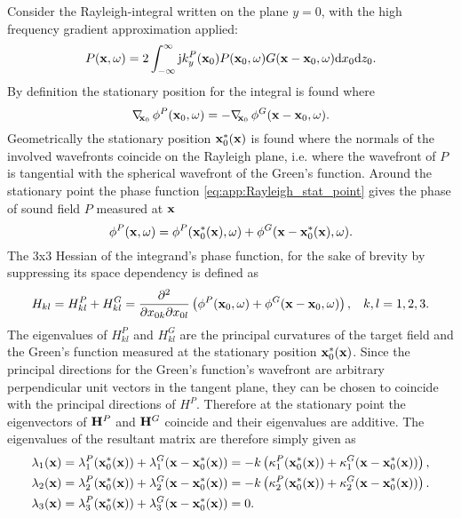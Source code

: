Consider the Rayleigh-integral written on the plane $y = 0$, with the high frequency gradient approximation applied:
\begin{equation}
P(\mathbf{x},\omega) = 2 \int_{-\infty}^{\infty} \mathrm{j} k_y^P(\mathbf{x}_0) P(\mathbf{x}_0, \omega) G(\mathbf{x}-\mathbf{x}_0,\omega) \mathrm{d} x_0  \mathrm{d} z_0.
\end{equation}
By definition the stationary position for the integral is found where
\begin{equation}
\label{eq:app:Rayleigh_stat_point}
\Dxo \phi^P(\vxo,\omega) = -\Dxo \phi^G(\vx-\vxo,\omega).  %
\end{equation}
Geometrically the stationary position $\mathbf{x}_0^*(\mathbf{x})$ is found where the normals of the involved wavefronts coincide on the Rayleigh plane, i.e. where the wavefront of $P$ is tangential with the spherical wavefront of the Green's function.
Around the stationary point the phase function \eqref{eq:app:Rayleigh_stat_point} gives the phase of sound field $P$ measured at $\mathbf{x}$
\begin{equation}
\phi^P(\vx,\omega) = \phi^P(\vxo^*(\vx),\omega) + \phi^G(\vx-\vxo^*(\vx),\omega).  %
\end{equation}
The 3x3 Hessian of the integrand's phase function, for the sake of brevity by suppressing its space dependency is defined as
\begin{equation}
\label{eq:app:Hessian_for_Rayleigh}
H_{kl} = H_{kl}^P+ H_{kl}^G = \frac{\partial^2}{\partial x_{0 k} \partial x_{0 l}}\left( \phi^P(\mathbf{x}_0,\omega) + \phi^G(\mathbf{x}-\mathbf{x}_0,\omega) \right), \hspace{3mm} k,l = 1,2,3.
\end{equation}
The eigenvalues of $H_{kl}^P$ and $H_{kl}^G$ are the principal curvatures of the target field and the Green's function measured at the stationary position $\mathbf{x}_0^*(\mathbf{x})$.
Since the principal directions for the Green's function's wavefront are arbitrary perpendicular unit vectors in the tangent plane, they can be chosen to coincide with the principal directions of $H^P$.
Therefore at the stationary point the eigenvectors of $\mathbf{H}^P$ and $\mathbf{H}^G$ coincide and their eigenvalues are additive.
The eigenvalues of the resultant matrix are therefore simply given as
\begin{align}
\label{eq:app:propagated_curvature}
\lambda_1(\mathbf{x}) &= \lambda_1^P(\mathbf{x}_0^*(\mathbf{x})) + \lambda_1^G(\mathbf{x}-\mathbf{x}_0^*(\mathbf{x})) = -k \left( \kappa_1^P(\mathbf{x}_0^*(\mathbf{x})) + \kappa_1^G(\mathbf{x}-\mathbf{x}_0^*(\mathbf{x})) \right), \\
\lambda_2(\mathbf{x}) &= \lambda_2^P(\mathbf{x}_0^*(\mathbf{x})) + \lambda_2^G(\mathbf{x}-\mathbf{x}_0^*(\mathbf{x})) = -k \left( \kappa_2^P(\mathbf{x}_0^*(\mathbf{x})) + \kappa_2^G(\mathbf{x}-\mathbf{x}_0^*(\mathbf{x})) \right). \\
\lambda_3(\mathbf{x}) &= \lambda_3^P(\mathbf{x}_0^*(\mathbf{x})) + \lambda_3^G(\mathbf{x}-\mathbf{x}_0^*(\mathbf{x})) = 0.
\end{align}
\vspace{0.5mm}

